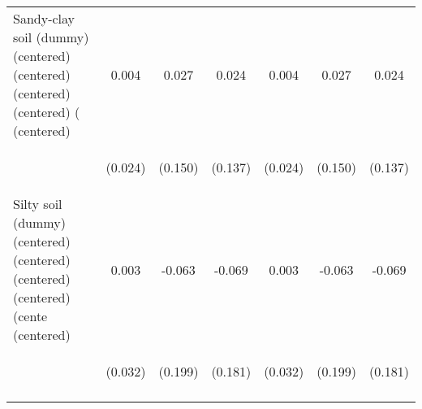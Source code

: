 \begin{center}
\begin{tabular}{lcccccc}
Sandy-clay soil (dummy) (centered) (centered) (centered) (centered) ( (centered) & 0.004 & 0.027 & 0.024 & 0.004 & 0.027 & 0.024 \\
\vspace{4pt} & \begin{footnotesize}(0.024)\end{footnotesize} & \begin{footnotesize}(0.150)\end{footnotesize} & \begin{footnotesize}(0.137)\end{footnotesize} & \begin{footnotesize}(0.024)\end{footnotesize} & \begin{footnotesize}(0.150)\end{footnotesize} & \begin{footnotesize}(0.137)\end{footnotesize} \\
Silty soil (dummy) (centered) (centered) (centered) (centered) (cente (centered) & 0.003 & -0.063 & -0.069 & 0.003 & -0.063 & -0.069 \\
 & \begin{footnotesize}(0.032)\end{footnotesize} & \begin{footnotesize}(0.199)\end{footnotesize} & \begin{footnotesize}(0.181)\end{footnotesize} & \begin{footnotesize}(0.032)\end{footnotesize} & \begin{footnotesize}(0.199)\end{footnotesize} & \begin{footnotesize}(0.181)\end{footnotesize} \\
\vspace{4pt} & \begin{footnotesize}\end{footnotesize} & \begin{footnotesize}\end{footnotesize} & \begin{footnotesize}\end{footnotesize} & \begin{footnotesize}\end{footnotesize} & \begin{footnotesize}\end{footnotesize} & \begin{footnotesize}\end{footnotesize} \\

\end{tabular}
\end{center}
